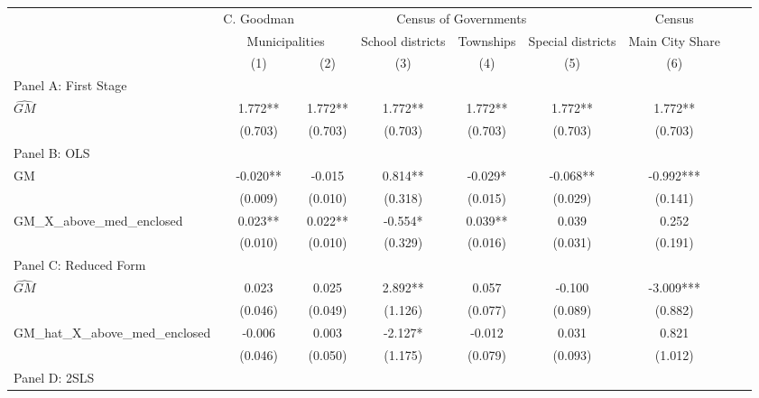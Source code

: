  \begin{tabular}{l*{8}{c}} \toprule
&\multicolumn{1}{c}{C. Goodman}&\multicolumn{4}{c}{Census of Governments}&\multicolumn{1}{c}{Census}\\\cmidrule(lr){2-2}\cmidrule(lr){3-6}\cmidrule(lr){7-7}
&\multicolumn{2}{c}{Municipalities}&\multicolumn{1}{c}{School districts}&\multicolumn{1}{c}{Townships}&\multicolumn{1}{c}{Special districts}&\multicolumn{1}{c}{Main City Share}\\\cmidrule(lr){2-3}\cmidrule(lr){4-6}\cmidrule(lr){7-7}
&\multicolumn{1}{c}{(1)}&\multicolumn{1}{c}{(2)}&\multicolumn{1}{c}{(3)}&\multicolumn{1}{c}{(4)}&\multicolumn{1}{c}{(5)}&\multicolumn{1}{c}{(6)}\\
\cmidrule(lr){1-7}
\multicolumn{6}{l}{Panel A: First Stage}\\
\cmidrule(lr){1-7}
$\widehat{GM}$  &    1.772** &    1.772** &    1.772** &    1.772** &    1.772** &    1.772** \\
                &  (0.703)   &  (0.703)   &  (0.703)   &  (0.703)   &  (0.703)   &  (0.703)   \\
\cmidrule(lr){1-7}
\multicolumn{6}{l}{Panel B: OLS}\\
\cmidrule(lr){1-7}
GM              &   -0.020** &   -0.015   &    0.814** &   -0.029*  &   -0.068** &   -0.992***\\
                &  (0.009)   &  (0.010)   &  (0.318)   &  (0.015)   &  (0.029)   &  (0.141)   \\
\addlinespace
GM\_X\_above\_med\_enclosed&    0.023** &    0.022** &   -0.554*  &    0.039** &    0.039   &    0.252   \\
                &  (0.010)   &  (0.010)   &  (0.329)   &  (0.016)   &  (0.031)   &  (0.191)   \\
\cmidrule(lr){1-7}
\multicolumn{6}{l}{Panel C: Reduced Form}\\
\cmidrule(lr){1-7}
$\widehat{GM}$  &    0.023   &    0.025   &    2.892** &    0.057   &   -0.100   &   -3.009***\\
                &  (0.046)   &  (0.049)   &  (1.126)   &  (0.077)   &  (0.089)   &  (0.882)   \\
\addlinespace
GM\_hat\_X\_above\_med\_enclosed&   -0.006   &    0.003   &   -2.127*  &   -0.012   &    0.031   &    0.821   \\
                &  (0.046)   &  (0.050)   &  (1.175)   &  (0.079)   &  (0.093)   &  (1.012)   \\
\cmidrule(lr){1-7}
\multicolumn{6}{l}{Panel D: 2SLS}\\

\end{tabular}

